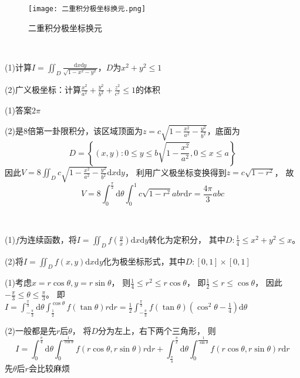 \begin{figure}[htp]
  \centering
  \texttt{[image: 二重积分极坐标换元.png]}
  \caption{二重积分极坐标换元}
\end{figure}

~

\begin{exercise}[规则极坐标与广义极坐标]
  (1)计算$I = \iint_D \frac{\mathrm{d} x \mathrm{d} y}{\sqrt{1 - x^2 - y^2}}$，$D$为$x^2 + y^2 \leq 1$

  (2)广义极坐标：计算$\frac{x^2}{a^2} + \frac{y^2}{b^2} + \frac{z^2}{c^2} \leq 1$的体积
\end{exercise}

\begin{solution}
  (1)答案$2\pi$

  (2)是$8$倍第一卦限积分，该区域顶面为$z = c \sqrt{1 - \frac{x^2}{a^2} - \frac{y^2}{b^2}}$，底面为
  \begin{equation*}
    D = \left\{ (x,y) : 0 \leq y \leq b \sqrt{1 - \frac{x^2}{a^2}}, 0 \leq x \leq a \right\}
  \end{equation*}
  因此$V = 8 \iint_D c \sqrt{1 - \frac{x^2}{a^2} - \frac{y^2}{b^2}}\mathrm{d} x \mathrm{d} y$，
  利用广义极坐标变换得到$z = c \sqrt{1 - r^2}$，
  故
  \begin{equation*}
    V = 8 \int_{0 }^{\frac{\pi}{2}} \mathrm{d} \theta \int_0^1 c \sqrt{1 - r^2}abr \mathrm{d} r = \frac{4\pi}{3}abc
  \end{equation*}
\end{solution}


~

\begin{exercise}[几道非规则边界]
  (1)$f$为连续函数，将$I = \iint_D f(\frac{y}{x})\mathrm{d}x \mathrm{d} y$转化为定积分，
  其中$D: \frac{1}{4} \leq x^2 + y^2 \leq x$。

  (2)将$I = \iint_D f(x,y)\mathrm{d} x \mathrm{d} y$化为极坐标形式，其中$D : [0,1] \times [0,1]$
\end{exercise}

\begin{solution}
  (1)考虑$x = r\cos \theta, y = r\sin \theta$，
  则$\frac{1}{4} \leq r^2 \leq r \cos \theta$，
  即$\frac{1}{2} \leq r \leq \cos \theta$，
  因此$- \frac{\pi}{3} \leq \theta \leq \frac{\pi}{3}$。
  即$I = \int_{-\frac{\pi}{3}}^{\frac{\pi}{3}} \mathrm{d} \theta \int_{\frac{1}{2}}^{\cos \theta} f(\tan \theta)r\mathrm{d}r = \frac{1}{2}\int_{-\frac{\pi}{3}}^{\frac{\pi}{3}}f(\tan \theta)(\cos^2 \theta - \frac{1}{4})\mathrm{d} \theta$

  (2)一般都是先$r$后$\theta$，
  将$D$分为左上，右下两个三角形，
  则
  \begin{equation*}
    I = \int_0^{\frac{\pi}{4}} \mathrm{d} \theta \int_0^{\frac{1}{\cos \theta}} f(r \cos \theta, r\sin\theta)r\mathrm{d}r + \int_{\frac{\pi}{4}}^{\frac{\pi}{2}} \mathrm{d} \theta \int_0^{\frac{1}{\sin\theta}} f(r\cos\theta, r\sin\theta)r\mathrm{d}r 
  \end{equation*}
  先$\theta$后$r$会比较麻烦
\end{solution}

